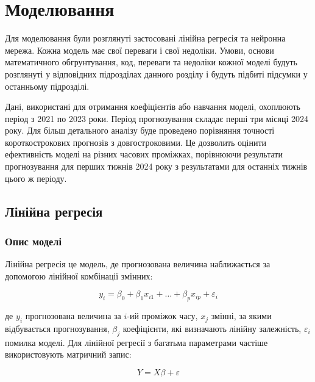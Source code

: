 \chapter{Моделювання}


Для моделювання були розглянуті застосовані лінійна регресія та нейронна мережа. 
Кожна модель має свої переваги і свої недоліки. 
Умови, основи математичного обгрунтування, код, переваги та недоліки кожної моделі будуть розглянуті у відповідних підрозділах данного розділу і будуть підбиті підсумки у останньому підрозділі.

Дані, використані для отримання коефіцієнтів або навчання моделі, охоплюють період з 2021 по 2023 роки. 
Період прогнозування складає перші три місяці 2024 року. 
Для більш детального аналізу буде проведено порівняння точності короткострокових прогнозів з довгостроковими. 
Це дозволить оцінити ефективність моделі на різних часових проміжках, порівнюючи результати прогнозування для перших тижнів 2024 року з результатами для останніх тижнів цього ж періоду.

\section{Лінійна регресія}

\subsection{Опис моделі}

Лінійна регресія це модель, де прогнозована величина наближається за допомогою лінійної комбінації змінних:

$$y_i = \beta_0 + \beta_1 x_{i 1} + \dots + \beta_p x_{i p} + \varepsilon_i$$

де $y_i$ прогнозована величина за $i$-ий проміжок часу, $x_j$ змінні, за якими відбувається прогнозування, $\beta_j$ коефіцієнти, які визначають лінійну залежність, $\varepsilon_i$ помилка моделі.\cite{linear_reg} 
Для лінійної регресії з багатьма параметрами частіше використовують матричний запис:

$$Y = X\beta + \varepsilon$$

